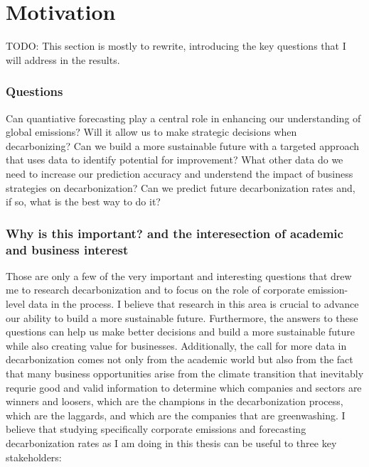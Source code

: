 \section{Motivation}
TODO: This section is mostly to rewrite, introducing the key questions that I will address in the results. 
\subsubsection{Questions}
 Can quantiative forecasting play a central role in enhancing our understanding of global emissions? Will it allow us to make strategic decisions when decarbonizing? Can we build a more sustainable future with a targeted approach that uses data to identify potential for improvement? What other data do we need to increase our prediction accuracy and understend the impact of business strategies on decarbonization? Can we predict future decarbonization rates and, if so, what is the best way to do it? \\ 
 \subsubsection{Why is this important? and the interesection of academic and business interest}
 \noindent Those are only a few of the very important and interesting questions that drew me to research decarbonization and to focus on the role of corporate emission-level data in the process. I believe that research in this area is crucial to advance our ability to build a more sustainable future. Furthermore, the answers to these questions can help us make better decisions and build a more sustainable future while also creating value for businesses. Additionally, the call for more data in decarbonization comes not only from the academic world but also from the fact that many business opportunities arise from the climate transition that inevitably requrie good and valid information to determine which companies and sectors are winners and loosers, which are the champions in the decarbonization process, which are the laggards, and which are the companies that are greenwashing. I believe that studying specifically corporate emissions and forecasting decarbonization rates as I am doing in this thesis can be useful to three key stakeholders: 

